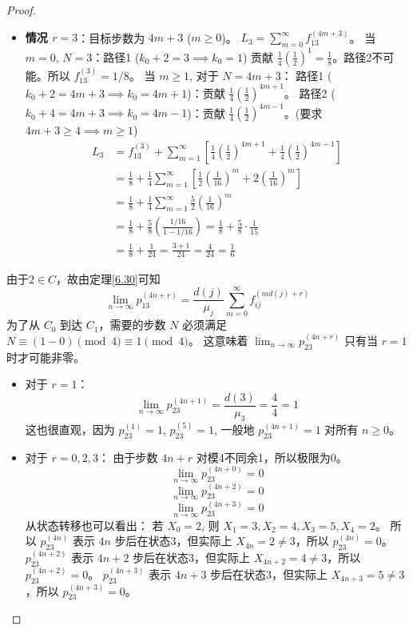 \documentclass[lang=cn,10pt,thmcnt=section]{elegantbook}
\begin{document}
\begin{proof}
\begin{itemize}
    \item \textbf{情况 $r=3$}：目标步数为 $4m+3$ ($m \ge 0$)。
    $L_3 = \sum_{m=0}^{\infty} f_{13}^{(4m+3)}$。
    当 $m=0$, $N=3$：路径1 ($k_0+2=3 \implies k_0=1$) 贡献 $\frac{1}{4}\left(\frac{1}{2}\right)^1 = \frac{1}{8}$。路径2不可能。所以 $f_{13}^{(3)} = 1/8$。
    当 $m \ge 1$, 对于 $N=4m+3$：
    路径1 ($k_0+2 = 4m+3 \implies k_0=4m+1$)：贡献 $\frac{1}{4}\left(\frac{1}{2}\right)^{4m+1}$。
    路径2 ($k_0+4 = 4m+3 \implies k_0=4m-1$)：贡献 $\frac{1}{4}\left(\frac{1}{2}\right)^{4m-1}$。(要求 $4m+3 \ge 4 \implies m \ge 1$)
    \begin{align*} L_3 &= f_{13}^{(3)} + \sum_{m=1}^{\infty} \left[ \frac{1}{4}\left(\frac{1}{2}\right)^{4m+1} + \frac{1}{4}\left(\frac{1}{2}\right)^{4m-1} \right] \\ &= \frac{1}{8} + \frac{1}{4} \sum_{m=1}^{\infty} \left[ \frac{1}{2}\left(\frac{1}{16}\right)^m + 2\left(\frac{1}{16}\right)^m \right] \\ &= \frac{1}{8} + \frac{1}{4} \sum_{m=1}^{\infty} \frac{5}{2}\left(\frac{1}{16}\right)^m \\ &= \frac{1}{8} + \frac{5}{8} \left( \frac{1/16}{1 - 1/16} \right) = \frac{1}{8} + \frac{5}{8} \cdot \frac{1}{15} \\ &= \frac{1}{8} + \frac{1}{24} = \frac{3+1}{24} = \frac{4}{24} = \frac{1}{6} \end{align*}
\end{itemize}




由于$2\in C$，故由定理\ref{6.30}可知
\[
\lim_{n \to \infty} p_{13}^{(4n+r)} = \frac{d(j)}{\mu_j} \sum_{m=0}^{\infty} f_{ij}^{(md(j)+r)}
\]
为了从 $C_0$ 到达 $C_1$，需要的步数 $N$ 必须满足 $N \equiv (1-0) \pmod 4 \equiv 1 \pmod 4$。
这意味着 $\lim_{n \to \infty} p_{23}^{(4n+r)}$ 只有当 $r=1$ 时才可能非零。

\begin{itemize}
    \item 对于 $r=1$：
    \[
    \lim_{n \to \infty} p_{23}^{(4n+1)} = \frac{d(3)}{\mu_3} = \frac{4}{4} = 1
    \]
    这也很直观，因为 $p_{23}^{(1)}=1$, $p_{23}^{(5)}=1$, 一般地 $p_{23}^{(4n+1)}=1$ 对所有 $n \ge 0$。

    \item 对于 $r=0, 2, 3$：
    由于步数 $4n+r$ 对模4不同余1，所以极限为0。
    \[ \lim_{n \to \infty} p_{23}^{(4n+0)} = 0 \]
    \[ \lim_{n \to \infty} p_{23}^{(4n+2)} = 0 \]
    \[ \lim_{n \to \infty} p_{23}^{(4n+3)} = 0 \]
    从状态转移也可以看出：
    若 $X_0=2$, 则 $X_1=3, X_2=4, X_3=5, X_4=2$。
    所以 $p_{23}^{(4n)}$ 表示 $4n$ 步后在状态3，但实际上 $X_{4n}=2 \ne 3$，所以 $p_{23}^{(4n)}=0$。
    $p_{23}^{(4n+2)}$ 表示 $4n+2$ 步后在状态3，但实际上 $X_{4n+2}=4 \ne 3$，所以 $p_{23}^{(4n+2)}=0$。
    $p_{23}^{(4n+3)}$ 表示 $4n+3$ 步后在状态3，但实际上 $X_{4n+3}=5 \ne 3$，所以 $p_{23}^{(4n+3)}=0$。
\end{itemize}


\end{proof}
\end{document}
